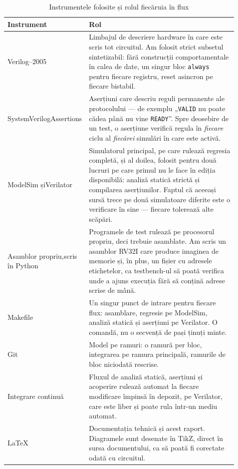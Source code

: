 \documentclass[11pt,openany]{report}
\newcommand{\sig}[1]{\texttt{#1}}
\begin{document}
\begin{table}[H]
\centering
\caption{Instrumentele folosite și rolul fiecăruia în flux}
\label{tab:tools}
\small
\begin{tabular}{@{}L{0.23\linewidth}L{0.68\linewidth}@{}}
\toprule
\textbf{Instrument} & \textbf{Rol} \\
\midrule
Verilog--2005 &
  Limbajul de descriere hardware în care este scris tot circuitul. Am folosit
  strict subsetul sintetizabil: fără construcții comportamentale în calea de
  date, un singur bloc \sig{always} pentru fiecare registru, reset asincron pe
  fiecare bistabil. \\
\addlinespace
SystemVerilog\newline Assertions &
  Aserțiuni care descriu reguli permanente ale protocolului --- de exemplu
  „\sig{VALID} nu poate cădea până nu vine \sig{READY}”. Spre deosebire de un
  test, o aserțiune verifică regula în \emph{fiecare} ciclu al \emph{fiecărei}
  simulări în care este activă. \\
\addlinespace
ModelSim și\newline Verilator &
  Simulatorul principal, pe care rulează regresia completă, și al doilea, folosit
  pentru două lucruri pe care primul nu le face în ediția disponibilă: analiză
  statică strictă și compilarea aserțiunilor. Faptul că aceeași sursă trece pe
  două simulatoare diferite este o verificare în sine --- fiecare tolerează alte
  scăpări. \\
\addlinespace
Asamblor propriu,\newline scris în Python &
  Programele de test rulează pe procesorul propriu, deci trebuie asamblate. Am
  scris un asamblor RV32I care produce imaginea de memorie și, în plus, un
  fișier cu adresele etichetelor, ca testbench-ul să poată verifica unde a ajuns
  execuția fără să conțină adrese scrise de mână. \\
\addlinespace
Makefile &
  Un singur punct de intrare pentru fiecare flux: asamblare, regresie pe
  ModelSim, analiză statică și aserțiuni pe Verilator. O comandă, nu o secvență
  de pași ținuți minte. \\
\addlinespace
Git &
  Model pe ramuri: o ramură per bloc, integrarea pe ramura principală, ramurile
  de bloc niciodată rescrise. \\
\addlinespace
Integrare continuă &
  Fluxul de analiză statică, aserțiuni și acoperire rulează automat la fiecare
  modificare împinsă în depozit, pe Verilator, care este liber și poate rula
  într-un mediu automat. \\
\addlinespace
LaTeX &
  Documentația tehnică și acest raport. Diagramele sunt desenate în TikZ, direct
  în sursa documentului, ca să poată fi corectate odată cu circuitul. \\
\bottomrule
\end{tabular}
\end{table}
\end{document}
